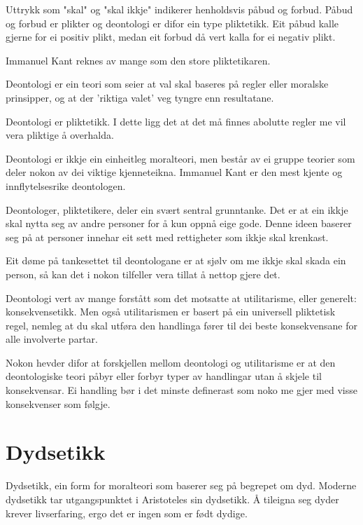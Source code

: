 \documentclass[a4paper]{IEEEtran}
\begin{document}
Uttrykk som "skal" og "skal ikkje" indikerer henholdsvis påbud og forbud. Påbud og forbud er plikter og deontologi er difor ein type pliktetikk. Eit påbud kalle gjerne for ei positiv plikt, medan eit forbud då vert kalla for ei negativ plikt.\bigskip

Immanuel Kant reknes av mange som den store pliktetikaren.\bigskip

Deontologi er ein teori som seier at val skal baseres på regler eller moralske prinsipper, og at der 'riktiga valet' veg tyngre enn resultatane.\bigskip

Deontologi er pliktetikk. I dette ligg det at det må finnes abolutte regler me vil vera pliktige å overhalda. \bigskip

Deontologi er ikkje ein einheitleg moralteori, men består av ei gruppe teorier som deler nokon av dei viktige kjenneteikna. Immanuel Kant er den mest kjente og innflytelsesrike deontologen.\bigskip

Deontologer, pliktetikere, deler ein svært sentral grunntanke. Det er at ein ikkje skal nytta seg av andre personer for å kun oppnå eige gode. Denne ideen baserer seg på at personer innehar eit sett med rettigheter som ikkje skal krenkast. \bigskip

Eit døme på tankesettet til deontologane er at sjølv om me ikkje skal skada ein person, så kan det i nokon tilfeller vera tillat å nettop gjere det. \bigskip

Deontologi vert av mange forstått som det motsatte at utilitarisme, eller generelt: konsekvensetikk. Men også utilitarismen er basert på ein universell pliktetisk regel, nemleg at du skal utføra den handlinga fører til dei beste konsekvensane for alle involverte partar.\bigskip

Nokon hevder difor at forskjellen mellom deontologi og utilitarisme er at den deontologiske teori påbyr eller forbyr typer av handlingar utan å skjele til konsekvensar. Ei handling bør i det minste definerast som noko me gjer med visse konsekvenser som følgje.\bigskip

\section{Dydsetikk}
\label{dydsetikk}\bigskip

Dydsetikk, ein form for moralteori som baserer seg på begrepet om dyd. Moderne dydsetikk tar utgangspunktet i Aristoteles sin dydsetikk. Å tileigna seg dyder krever livserfaring, ergo det er ingen som er født dydige.\bigskip
\end{document}
